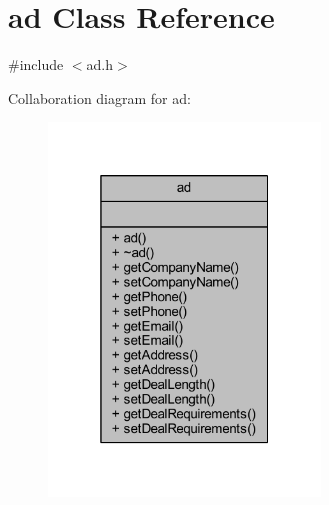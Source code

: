 \hypertarget{classad}{}\section{ad Class Reference}
\label{classad}


{\ttfamily \#include $<$ad.\+h$>$}



Collaboration diagram for ad\+:
\nopagebreak
\begin{figure}[H]
\begin{center}
\leavevmode
\includegraphics[width=205pt]{classad__coll__graph}
\end{center}
\end{figure}

